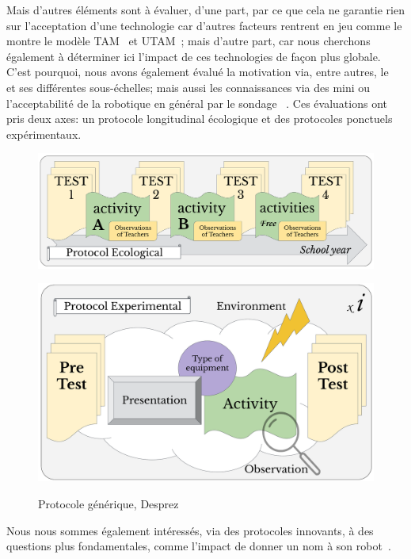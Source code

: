     Mais d'autres éléments sont à évaluer, d'une part, par ce que cela ne garantie rien sur l'acceptation d'une technologie car d'autres facteurs rentrent en jeu comme le montre le modèle TAM~ et UTAM~; mais d'autre part, car nous cherchons également à déterminer ici l'impact de ces technologies de façon plus globale. C'est pourquoi, nous avons également évalué la motivation via, entre autres, le ~ et ses différentes sous-échelles; mais aussi les connaissances via des mini  ou l'acceptabilité de la robotique en général par le sondage ~.
    Ces évaluations ont pris deux axes: \Li un protocole longitudinal écologique et \ii des protocoles ponctuels expérimentaux. 
    \begin{figure}[!h]
    \begin{minipage}{0.63\linewidth}
            \centering
        \includegraphics[width=\linewidth]{Figures/Desprez-protocole-eco.pdf}
        \label{fig:protocole-eco}
    \end{minipage}\hfill    
    \begin{minipage}{0.36\linewidth}
            \centering
        \includegraphics[width=\linewidth]{Figures/Desprez-protocole-exp.pdf}
    \label{fig:protocole-exp}
    \end{minipage}
    \caption{Protocole générique, Desprez~}
    \label{fig:protocole}
    \end{figure}\par%
    Nous nous sommes également intéressés, via des protocoles innovants, à des questions plus fondamentales, comme l'impact de donner un nom à son robot~.\par%
